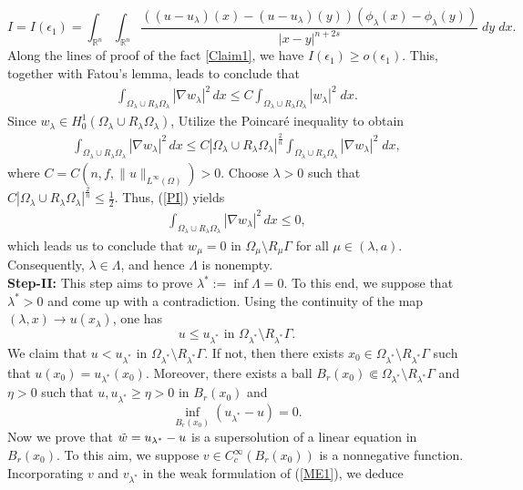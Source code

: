 \documentclass[11pt, notitlepage]{article}
\def\R{\mathbb{R}}
\begin{document}
{$$I=I(\epsilon_1)=\int_{\R^n}\int_{\R^n}\frac{((u-u_\lambda)(x)-(u-u_\lambda)(y))(\phi_\lambda(x)-\phi_\lambda(y))}{|x-y|^{n+2s}}\;dy\;dx.$$
Along the lines of proof of the fact \eqref{Claim1}, we have $I(\epsilon_1)\geq o(\epsilon_1)$. This, together with Fatou's lemma, leads to conclude that 
\begin{align*}
    \int_{\Omega_\lambda\cup R_\lambda\Omega_\lambda}|\nabla w_\lambda|^2\,dx\leq C\int_{\Omega_\lambda\cup R_\lambda\Omega_\lambda}|w_\lambda|^2\;dx.
\end{align*}
Since $w_\lambda\in H^1_0(\Omega_\lambda\cup R_\lambda\Omega_\lambda)$, Utilize the Poincar\'{e} inequality to obtain
\begin{align}\label{PI}
    \int_{\Omega_\lambda\cup R_\lambda\Omega_\lambda}|\nabla w_\lambda|^2\,dx\leq C|\Omega_\lambda\cup R_\lambda\Omega_\lambda|^\frac{2}{n}\int_{\Omega_\lambda\cup R_\lambda\Omega_\lambda}|\nabla w_\lambda|^2\;dx,
\end{align}
where $C=C(n,f,\|u\|_{L^\infty(\Omega)})>0$. Choose $\lambda>0$ such that $C|\Omega_\lambda\cup R_\lambda\Omega_\lambda|^\frac{2}{n}\leq \frac{1}{2}$. Thus, (\ref{PI}) yields 
\begin{align*}
     \int_{\Omega_\lambda\cup R_\lambda\Omega_\lambda}|\nabla w_\lambda|^2\,dx\leq 0,
\end{align*}
which leads us to conclude that
$w_\mu=0$ in $\Omega_\mu\setminus R_\mu\Gamma$ for all $\mu\in (\lambda,a)$. Consequently, $\lambda\in \Lambda$, and hence $\Lambda$ is nonempty.\\
\textbf{Step-II:} This step aims to prove $\lambda^*:=\inf \Lambda=0$. To this end, we suppose that $\lambda^*>0$ and come up with a contradiction. Using the continuity of the map $(\lambda,x)\to u(x_\lambda)$, one has $$u\leq u_{\lambda^*}\text{ in }\Omega_{\lambda^*}\setminus R_{\lambda^*}\Gamma.$$
We claim that $u<u_{\lambda^*}\text{ in }\Omega_{\lambda^*}\setminus R_{\lambda^*}\Gamma.$ If not, then there exists $x_0\in \Omega_{\lambda^*}\setminus R_{\lambda^*}\Gamma$ such that $u(x_0)=u_{\lambda^*}(x_0)$. Moreover, there exists a ball $B_r(x_0)\Subset\Omega_{\lambda^*}\setminus R_{\lambda^*}\Gamma$ and $\eta>0$ such that $u,u_{\lambda^*}\geq \eta>0$ in $B_r(x_0)$ and $$\inf_{B_r(x_0)} (u_{\lambda^*}-u)=0.$$ 
Now we prove that $\Tilde{w}=u_{\lambda^*}-u$ is a supersolution of a linear equation in $B_r(x_0)$. To this aim, we suppose $v\in C_c^\infty(B_r(x_0))$ is a nonnegative function. Incorporating $v$ and $v_{\lambda^*}$ in the weak formulation of (\ref{ME1}), we deduce
\begin{align}\label{LaxmiB1}

\end{align}}
\end{document}
